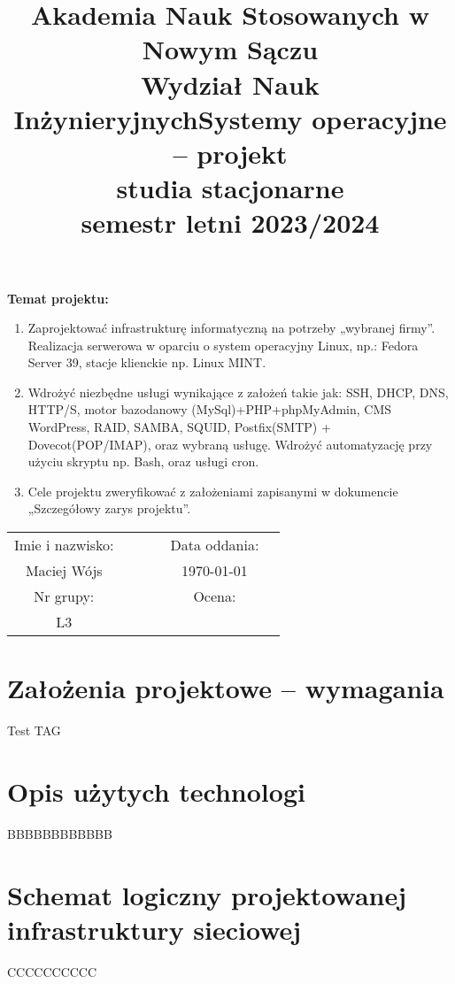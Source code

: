 \documentclass[a4paper]{article}
\title{\textbf{Akademia Nauk Stosowanych w Nowym Sączu\\Wydział Nauk Inżynieryjnych\newline \newline Systemy operacyjne – projekt\\studia stacjonarne\\semestr letni 2023/2024}}
\date{}
\begin{document}
\maketitle

\textbf{Temat projektu:}
\begin{enumerate}
    \item Zaprojektować infrastrukturę informatyczną na potrzeby „wybranej firmy”. Realizacja
    serwerowa w oparciu o system operacyjny Linux, np.: Fedora Server 39, stacje klienckie
    np. Linux MINT.
    \item Wdrożyć niezbędne usługi wynikające z założeń takie jak: SSH, DHCP, DNS, HTTP/S,
    motor bazodanowy (MySql)+PHP+phpMyAdmin, CMS WordPress, RAID, SAMBA,
    SQUID, Postfix(SMTP) + Dovecot(POP/IMAP), oraz wybraną usługę. Wdrożyć
    automatyzację przy użyciu skryptu np. Bash, oraz usługi cron. 
    \item Cele projektu zweryfikować z założeniami zapisanymi w dokumencie „Szczegółowy
    zarys projektu”. 
\end{enumerate}

\renewcommand{\arraystretch}{1.25}

\setlength{\tabcolsep}{12pt}

\begin{table}[h!]
    \centering
    \begin{tabular}{cccccc}
    Imie i nazwisko: &&&& Data oddania: \\
    Maciej Wójs &&&& \today \\
    Nr grupy: &&&& Ocena: \\
    L3 &  \\
    \end{tabular}
\end{table}

\newpage
\tableofcontents
\newpage

\section{Założenia projektowe – wymagania}
Test TAG 
\section{Opis użytych technologi}
BBBBBBBBBBBB
\section{Schemat logiczny projektowanej infrastruktury sieciowej}
CCCCCCCCCC
\end{document}
